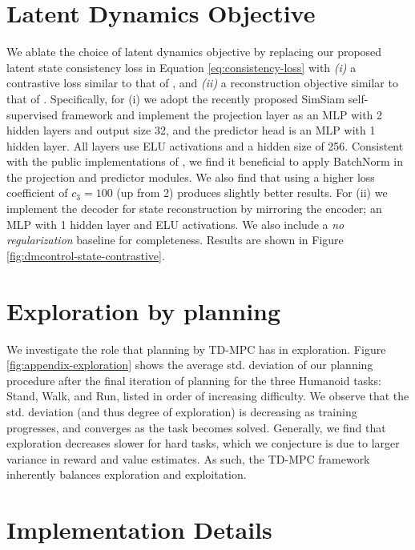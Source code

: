 \documentclass{article}
\begin{document}
\section{Latent Dynamics Objective}
\label{sec:appendix-loss-ablations}
We ablate the choice of latent dynamics objective by replacing our proposed latent state consistency loss in Equation \ref{eq:consistency-loss} with \textit{(i)} a contrastive loss similar to that of \citet{Ye2021MasteringAG, hansen2021softda}, and \textit{(ii)} a reconstruction objective similar to that of \citet{ha2018worldmodels, hafner2019planet, Hafner2020DreamTC}. Specifically, for (i) we adopt the recently proposed SimSiam \citep{Chen2021ExploringSS} self-supervised framework and implement the projection layer as an MLP with 2 hidden layers and output size 32, and the predictor head is an MLP with 1 hidden layer. All layers use ELU activations and a hidden size of 256. Consistent with the public implementations of \citet{Ye2021MasteringAG, hansen2021softda}, we find it beneficial to apply BatchNorm in the projection and predictor modules. We also find that using a higher loss coefficient of $c_{3}=100$ (up from 2) produces slightly better results. For (ii) we implement the decoder for state reconstruction by mirroring the encoder; an MLP with 1 hidden layer and ELU activations. We also include a \textit{no regularization} baseline for completeness. Results are shown in Figure \ref{fig:dmcontrol-state-contrastive}.


\section{Exploration by planning}
\label{sec:appendix-exploration}

We investigate the role that planning by TD-MPC has in exploration. Figure \ref{fig:appendix-exploration} shows the average std. deviation of our planning procedure after the final iteration of planning for the three Humanoid tasks: Stand, Walk, and Run, listed in order of increasing difficulty. We observe that the std. deviation (and thus degree of exploration) is decreasing as training progresses, and converges as the task becomes solved. Generally, we find that exploration decreases slower for hard tasks, which we conjecture is due to larger variance in reward and value estimates. As such, the TD-MPC framework inherently balances exploration and exploitation.


\section{Implementation Details}
\label{sec:appendix-implementation-details}
\end{document}
